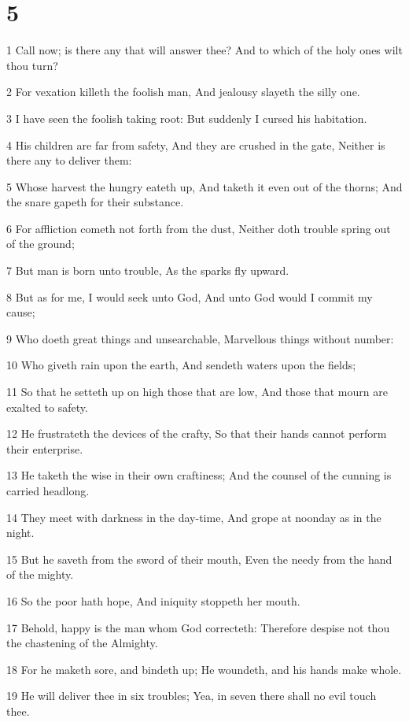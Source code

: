 \chapter{5}

\par 1 Call now; is there any that will answer thee? And to which of the holy ones wilt thou turn?
\par 2 For vexation killeth the foolish man, And jealousy slayeth the silly one.
\par 3 I have seen the foolish taking root: But suddenly I cursed his habitation.
\par 4 His children are far from safety, And they are crushed in the gate, Neither is there any to deliver them:
\par 5 Whose harvest the hungry eateth up, And taketh it even out of the thorns; And the snare gapeth for their substance.
\par 6 For affliction cometh not forth from the dust, Neither doth trouble spring out of the ground;
\par 7 But man is born unto trouble, As the sparks fly upward.
\par 8 But as for me, I would seek unto God, And unto God would I commit my cause;
\par 9 Who doeth great things and unsearchable, Marvellous things without number:
\par 10 Who giveth rain upon the earth, And sendeth waters upon the fields;
\par 11 So that he setteth up on high those that are low, And those that mourn are exalted to safety.
\par 12 He frustrateth the devices of the crafty, So that their hands cannot perform their enterprise.
\par 13 He taketh the wise in their own craftiness; And the counsel of the cunning is carried headlong.
\par 14 They meet with darkness in the day-time, And grope at noonday as in the night.
\par 15 But he saveth from the sword of their mouth, Even the needy from the hand of the mighty.
\par 16 So the poor hath hope, And iniquity stoppeth her mouth.
\par 17 Behold, happy is the man whom God correcteth: Therefore despise not thou the chastening of the Almighty.
\par 18 For he maketh sore, and bindeth up; He woundeth, and his hands make whole.
\par 19 He will deliver thee in six troubles; Yea, in seven there shall no evil touch thee.
